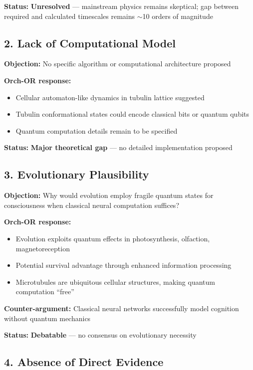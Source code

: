 \textbf{Status:} \textbf{Unresolved} --- mainstream physics remains skeptical; gap between required and calculated timescales remains $\sim$10 orders of magnitude

\subsection{2. Lack of Computational Model}

\textbf{Objection:} No specific algorithm or computational architecture proposed

\textbf{Orch-OR response:}
\begin{itemize}
\item Cellular automaton-like dynamics in tubulin lattice suggested
\item Tubulin conformational states could encode classical bits or quantum qubits
\item Quantum computation details remain to be specified
\end{itemize}

\textbf{Status:} \textbf{Major theoretical gap} --- no detailed implementation proposed

\subsection{3. Evolutionary Plausibility}

\textbf{Objection:} Why would evolution employ fragile quantum states for consciousness when classical neural computation suffices?

\textbf{Orch-OR response:}
\begin{itemize}
\item Evolution exploits quantum effects in photosynthesis, olfaction, magnetoreception
\item Potential survival advantage through enhanced information processing
\item Microtubules are ubiquitous cellular structures, making quantum computation ``free''
\end{itemize}

\textbf{Counter-argument:} Classical neural networks successfully model cognition without quantum mechanics

\textbf{Status:} \textbf{Debatable} --- no consensus on evolutionary necessity

\subsection{4. Absence of Direct Evidence}

